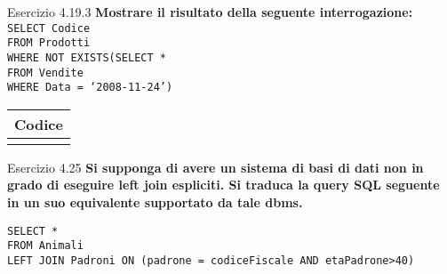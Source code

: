 \begin{frame}{Esercizio 4.19.3}
    \textbf{Mostrare il risultato della seguente interrogazione:}\\
    \texttt{SELECT Codice\\FROM Prodotti\\WHERE NOT EXISTS(SELECT *\\\hspace{8,5em}FROM Vendite\\\hspace{8,5em}WHERE Data = `2008-11-24')}
    \begin{table}[h]
    \centering
    \begin{minipage}{.45\textwidth}
    \centering
    \begin{tabular}{|c|}
    \hline
    \rowcolor{cyan!30} Codice \\
    \hline
    \\
    \hline
    \end{tabular}
    \end{minipage}%
    \end{table}
\end{frame}
\begin{frame}{Esercizio 4.25}
    \textbf{Si supponga di avere un sistema di basi di dati non in grado di
eseguire left join espliciti. Si traduca la query SQL seguente in un suo equivalente
supportato da tale dbms.}
    \vspace{1em}
    
    \texttt{SELECT *\\FROM Animali \\LEFT JOIN Padroni ON (padrone = codiceFiscale AND etaPadrone>40)}
\end{frame}

